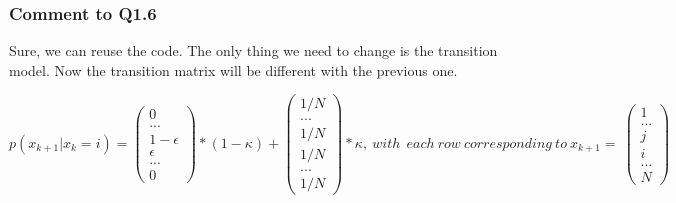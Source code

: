 \documentclass[11pt]{article}
\begin{document}
    \subsubsection{Comment to Q1.6}\label{comment-to-q1.6}

Sure, we can reuse the code. The only thing we need to change is the
transition model. Now the transition matrix will be different with the
previous one.

\[p(x_{k+1}|x_k=i)= \begin{pmatrix}
 0   \\
...  \\
1 - \epsilon  \\
\epsilon  \\
...  \\
0 
\end{pmatrix} * (1 -\kappa) + 
\begin{pmatrix}
 1/N   \\
...  \\
 1/N  \\
  1/N \\
...  \\
  1/N
\end{pmatrix} * \kappa, \ with\ \  each\  row \  corresponding\ to \ x_{k+1} = \  
\begin{pmatrix}
 1   \\
...  \\
j \\
i  \\
...  \\
N 
\end{pmatrix}  \]
\end{document}
